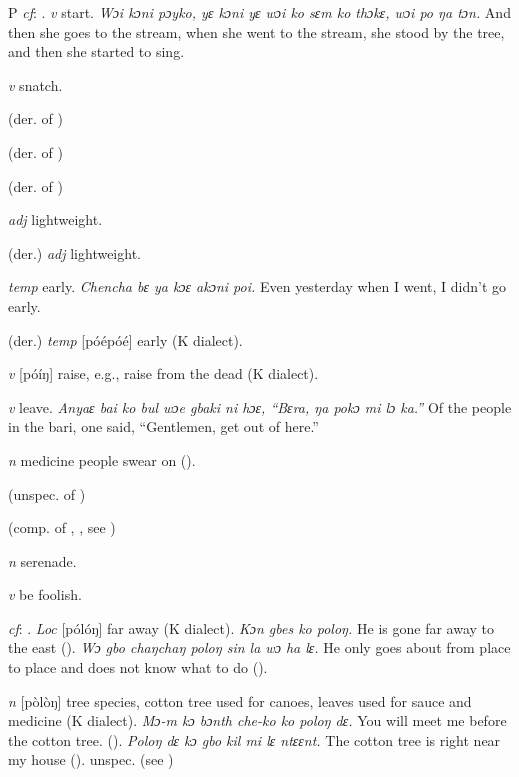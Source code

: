 \begin{letter}{P}
 \textit{cf}: . \textit{v} start. \textit{Wɔi kɔni pɔyko, yɛ kɔni yɛ wɔi ko sɛm ko thɔkɛ, wɔi po ŋa tɔn.} And then she goes to the stream, when she went to the stream, she stood by the tree, and then she started to sing.

 \textit{v} snatch.

 (der. of ) 

 (der. of ) 

 (der. of ) 

 \textit{adj} lightweight.

 (der.) \textit{adj} lightweight.

 \textit{temp} early. \textit{Chencha bɛ ya kɔɛ akɔni poi.} Even yesterday when I went, I didn't go early.

 (der.) \textit{temp} [póépóé] early (K dialect). 

 \textit{v} [póíŋ] raise, e.g., raise from the dead (K dialect). 

 \textit{v} leave. \textit{Anyaɛ bai ko bul wɔe gbaki ni hɔɛ, “Bɛra, ŋa pokɔ mi lɔ ka.”} Of the people in the bari, one said, “Gentlemen, get out of here.”

 \textit{n} medicine people swear on (\citealt{Hall1938}).

 (unspec. of )

 (comp. of , , see ) 

 \textit{n} serenade.

 \textit{v} be foolish.

 \textit{cf}: . \textit{Loc} [pólóŋ] far away (K dialect). \textit{Kɔn gbes ko poloŋ.} He is gone far away to the east (\citealt{Pichl1967}). \textit{Wɔ gbo chaŋchaŋ poloŋ sin la wɔ ha lɛ.} He only goes about from place to place and does not know what to do (\citealt{Pichl1967}). 

 \textit{n} [pòlòŋ] tree species, cotton tree used for canoes, leaves used for sauce and medicine (K dialect). \textit{Mɔ-m kɔ bɔnth che-ko ko poloŋ dɛ.} You will meet me before the cotton tree. (\citealt{Pichl1967}). \textit{Poloŋ dɛ kɔ gbo kil mi lɛ ntɛɛnt.} The cotton tree is right near my house (\citealt{Pichl1967}). unspec.  (see ) 


\end{letter}
